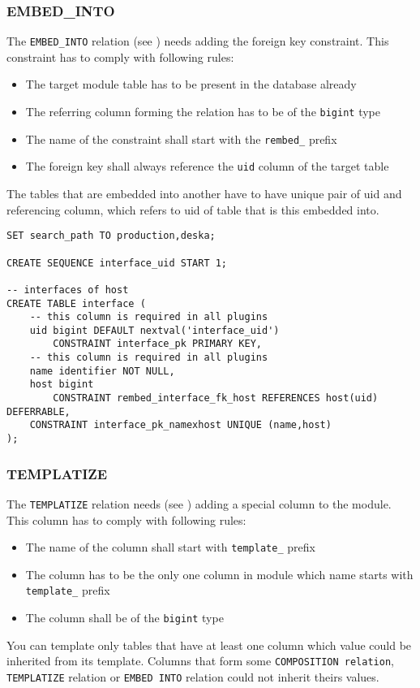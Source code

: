 \documentclass[deska]{subfiles}
\begin{document}
\subsubsection{EMBED\_INTO}
The {\tt EMBED\_INTO} relation (see ) needs adding the foreign key constraint. This constraint has to comply with following rules:
\begin{itemize}
    \item The target module table has to be present in the database already
    \item The referring column forming the relation has to be of the {\tt bigint} type
    \item The name of the constraint shall start with the {\tt rembed\_} prefix
    \item The foreign key shall always reference the {\tt uid} column of the target table
\end{itemize}
The tables that are embedded into another have to have unique pair of uid and referencing column, which refers to uid of table that is this embedded into.
\begin{verbatim}
SET search_path TO production,deska;

CREATE SEQUENCE interface_uid START 1;

-- interfaces of host
CREATE TABLE interface (
    -- this column is required in all plugins
    uid bigint DEFAULT nextval('interface_uid')
        CONSTRAINT interface_pk PRIMARY KEY,
    -- this column is required in all plugins
    name identifier NOT NULL,
    host bigint
        CONSTRAINT rembed_interface_fk_host REFERENCES host(uid) DEFERRABLE,
    CONSTRAINT interface_pk_namexhost UNIQUE (name,host)
);
\end{verbatim}


\subsubsection{TEMPLATIZE}
The {\tt TEMPLATIZE} relation needs (see ) adding a special column to the module. This column has to comply with following rules:
\begin{itemize}
    \item The name of the column shall start with {\tt template\_} prefix
    \item The column has to be the only one column in module which name starts with {\tt template\_} prefix
    \item The column shall be of the {\tt bigint} type
\end{itemize}
You can template only tables that have at least one column which value could be inherited from its template. Columns that form some {\tt COMPOSITION relation}, {\tt TEMPLATIZE} relation or {\tt EMBED INTO} relation could not inherit theirs values.
\end{document}
